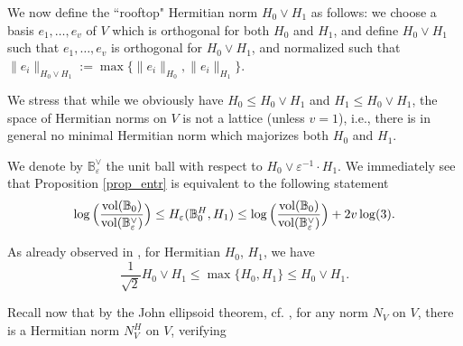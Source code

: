 \documentclass[12pt]{article}
\numberwithin{equation}{section}
\theoremstyle{theorem}
\theoremstyle{definition}
\theoremstyle{remark}
\newcommand{\comp}{\mathbb{C}}
\begin{document}
	We now define the “rooftop" Hermitian norm $H_0 \vee H_1$ as follows: we choose a basis $e_1, \ldots, e_v$ of $V$ which is orthogonal for both $H_0$ and $H_1$, and define $H_0 \vee H_1$ such that $e_1, \ldots, e_v$ is orthogonal for $H_0 \vee H_1$, and normalized such that $\| e_i \|_{H_0 \vee H_1} := \max \{ \| e_i \|_{H_0}, \| e_i \|_{H_1} \}$.
	\par 
	We stress that while we obviously have $H_0 \leq H_0 \vee H_1$ and $H_1 \leq H_0 \vee H_1$, the space of Hermitian norms on $V$ is not a lattice (unless $v = 1$), i.e., there is in general no minimal Hermitian norm which majorizes both $H_0$ and $H_1$.
	\par 
	We denote by $\mathbb{B}^{\vee}_{\varepsilon}$ the unit ball with respect to $H_0 \vee \varepsilon^{-1} \cdot H_1$.
	We immediately see that Proposition \ref{prop_entr} is equivalent to the following statement
	\begin{equation}\label{eq_prop_entr_ref}
		\log \Big( \frac{{\rm{vol}}(\mathbb{B}_{0})}{{\rm{vol}}(\mathbb{B}^{\vee}_{\varepsilon})} \Big)
		\leq
		H_{\varepsilon}(\mathbb{B}^H_0, H_1)
		\leq
		\log \Big( \frac{{\rm{vol}}(\mathbb{B}_{0})}{{\rm{vol}}(\mathbb{B}^{\vee}_{\varepsilon})} \Big)
		+
		2v \log(3).
	\end{equation}
	\par 
	As already observed in \cite[(3.21)]{FinGQBig}, for Hermitian $H_0$, $H_1$, we have 
	\begin{equation}\label{eq_max_vee_comp}
		\frac{1}{\sqrt{2}} H_0 \vee H_1 \leq \max\{H_0, H_1\} \leq H_0 \vee H_1.
	\end{equation}

	\par 
	Recall now that by the John ellipsoid theorem, cf. \cite[p. 27]{PisierBook}, for any norm $N_V$ on $V$, there is a Hermitian norm $N_V^H$ on $V$, verifying 
\end{document}
